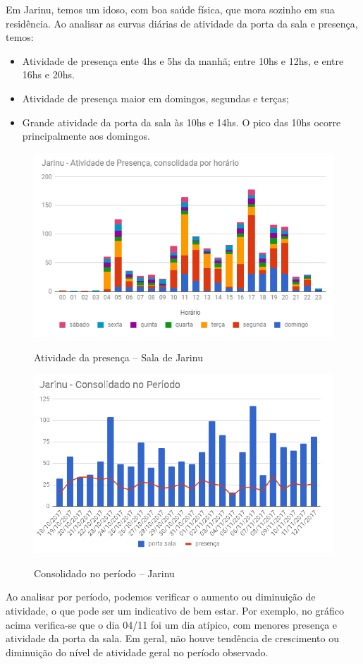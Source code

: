 Em Jarinu, temos um idoso, com boa saúde física, que mora sozinho em sua residência. Ao analisar as curvas diárias de atividade da porta da sala e presença, temos:

\begin{itemize}
	\item Atividade de presença ente 4hs e 5hs da manhã; entre 10hs e 12hs, e entre 16hs e 20hs.
	\item Atividade de presença maior em domingos, segundas e terças;
	\item Grande atividade da porta da sala às 10hs e 14hs. O pico das 10hs ocorre principalmente aos domingos.
\end{itemize}

\begin{figure}[H]
	\centering
	\caption{Atividade da presença -- Sala de Jarinu}
	\includegraphics[width=1.0\textwidth]{AtivPresencaJarinu}
	\label{fig:AtivPresencaJarinu}
\end{figure}

\begin{figure}[H]
	\centering
	\caption{Consolidado no período -- Jarinu}
	\includegraphics[width=1.0\textwidth]{JarinuPeriodo}
	\label{fig:JarinuPeriodo}
\end{figure}

Ao analisar por período, podemos verificar o aumento ou diminuição de atividade, o que pode ser um indicativo de bem estar. Por exemplo, no gráfico acima verifica-se que o dia 04/11 foi um dia atípico, com menores presença e atividade da porta da sala. Em geral, não houve tendência de crescimento ou diminuição do nível de atividade geral no período observado.
